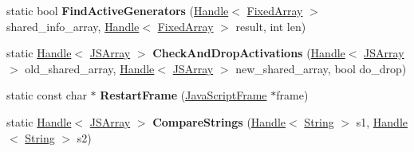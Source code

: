 \begin{DoxyCompactItemize}
\item 
static bool {\bfseries Find\+Active\+Generators} (\hyperlink{classv8_1_1internal_1_1_handle}{Handle}$<$ \hyperlink{classv8_1_1internal_1_1_fixed_array}{Fixed\+Array} $>$ shared\+\_\+info\+\_\+array, \hyperlink{classv8_1_1internal_1_1_handle}{Handle}$<$ \hyperlink{classv8_1_1internal_1_1_fixed_array}{Fixed\+Array} $>$ result, int len)\hypertarget{classv8_1_1internal_1_1_live_edit_a2a7883bd24f0af7910bdc3af66af6c01}{}\label{classv8_1_1internal_1_1_live_edit_a2a7883bd24f0af7910bdc3af66af6c01}

\item 
static \hyperlink{classv8_1_1internal_1_1_handle}{Handle}$<$ \hyperlink{classv8_1_1internal_1_1_j_s_array}{J\+S\+Array} $>$ {\bfseries Check\+And\+Drop\+Activations} (\hyperlink{classv8_1_1internal_1_1_handle}{Handle}$<$ \hyperlink{classv8_1_1internal_1_1_j_s_array}{J\+S\+Array} $>$ old\+\_\+shared\+\_\+array, \hyperlink{classv8_1_1internal_1_1_handle}{Handle}$<$ \hyperlink{classv8_1_1internal_1_1_j_s_array}{J\+S\+Array} $>$ new\+\_\+shared\+\_\+array, bool do\+\_\+drop)\hypertarget{classv8_1_1internal_1_1_live_edit_a87cfb1db56ba26136a1f10343454234c}{}\label{classv8_1_1internal_1_1_live_edit_a87cfb1db56ba26136a1f10343454234c}

\item 
static const char $\ast$ {\bfseries Restart\+Frame} (\hyperlink{classv8_1_1internal_1_1_java_script_frame}{Java\+Script\+Frame} $\ast$frame)\hypertarget{classv8_1_1internal_1_1_live_edit_a1bad0f05b0b31ac1c4dcf36ee2052f7a}{}\label{classv8_1_1internal_1_1_live_edit_a1bad0f05b0b31ac1c4dcf36ee2052f7a}

\item 
static \hyperlink{classv8_1_1internal_1_1_handle}{Handle}$<$ \hyperlink{classv8_1_1internal_1_1_j_s_array}{J\+S\+Array} $>$ {\bfseries Compare\+Strings} (\hyperlink{classv8_1_1internal_1_1_handle}{Handle}$<$ \hyperlink{classv8_1_1internal_1_1_string}{String} $>$ s1, \hyperlink{classv8_1_1internal_1_1_handle}{Handle}$<$ \hyperlink{classv8_1_1internal_1_1_string}{String} $>$ s2)\hypertarget{classv8_1_1internal_1_1_live_edit_acd0da5b9c5a98a4029ac4a36b2a566b8}{}\label{classv8_1_1internal_1_1_live_edit_acd0da5b9c5a98a4029ac4a36b2a566b8}

\end{DoxyCompactItemize}
